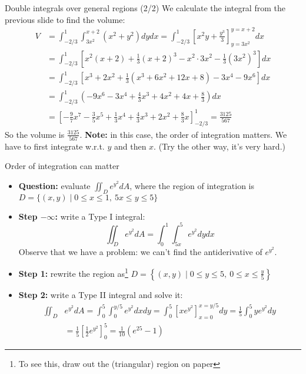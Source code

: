 \begin{frame}{Double integrals over general regions (2/2)}
\small
         We calculate the integral from the previous slide to find the volume:
         \begin{align*}
             V&=\int_{-2/3}^{1}\int_{3x^2}^{x+2}(x^2+y^2)dydx=\int_{-2/3}^{1}\left[x^2y+\frac{y^3}{3}\right]_{y=3x^2}^{y=x+2}dx\\
              &=\int_{-2/3}^{1}\left[x^2(x+2)+\frac{1}{3}(x+2)^3-x^2\cdot3x^2-\frac{1}{3}(3x^2)^3\right]dx\\
              &=\int_{-2/3}^{1}\left[x^3+2x^2+\frac{1}{3}\left(x^3+6x^2+12x+8\right)-3x^4-9x^6\right]dx\\
              &=\int_{-2/3}^{1}\left(-9x^6-3x^4+\frac{4}{3}x^3+4x^2+4x+\frac{8}{3}\right)dx\\
              &=\left[-\frac{9}{7}x^7-\frac{3}{5}x^5+\frac{1}{3}x^4+\frac{4}{3}x^3+2x^2+\frac{8}{3}x\right]_{-2/3}^{1} =\boxed{ \frac{3125}{567}}
         \end{align*}
         \pause So the volume is $\frac{3125}{567}$. \textbf{Note:} in this case, the order of integration matters. We have to first integrate w.r.t. $y$ and then $x$. (Try the other way, it's very hard.)
\end{frame}

\begin{frame}{Order of integration can matter}
    \small
    \begin{itemize}
        \item \textbf{Question:} evaluate $\iint_De^{y^2}dA$, where the region of integration is
            $D=\{(x,y)\mid 0\leq x\leq1,~5x\leq y\leq5\}$
        \item\pause \textbf{Step $\pmb{-\infty}$:} write a Type I integral:
            \[\iint_De^{y^2}dA=\int_0^1\int_{5x}^5e^{y^2}dydx\]
        \pause Observe that we have a problem: we can't find the antiderivative of $e^{y^2}$.
        \item\pause \textbf{Step 1:} rewrite the region as\footnote{To see this, draw out the (triangular) region on paper}
            $D=\left\{(x,y)\mid 0\leq y\leq5,~0\leq x\leq\frac{y}{5}\right\}$
        \item\pause \textbf{Step 2:} write a Type II integral and solve it:
            \begin{align*}
                \iint_D&e^{y^2}dA=\int_0^5\int_0^{y/5}e^{y^2}dxdy = \int_0^5 \left[xe^{y^2}\right]_{x=0}^{x=y/5}dy=\frac{1}{5}\int_0^5ye^{y^2}dy\\
                &=\frac{1}{5}\left[\frac{1}{2}e^{y^2}\right]_0^5=\boxed{\frac{1}{10}(e^{25}-1)}
            \end{align*}
    \end{itemize}
\end{frame}

